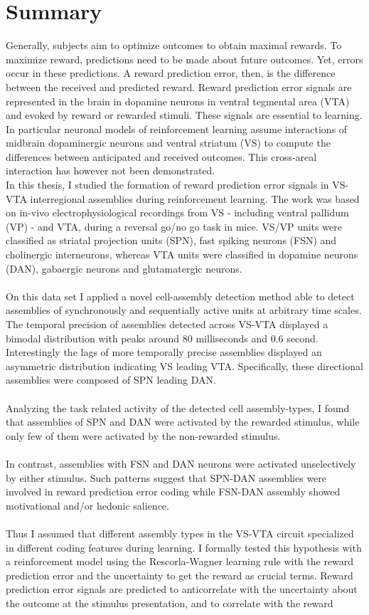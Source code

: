 \section*{Summary}
Generally, subjects aim to optimize outcomes to obtain maximal rewards. To maximize reward, predictions need to be made about future outcomes. Yet, errors occur in these predictions. A reward prediction error, then, is the difference between the received and predicted reward. Reward prediction error signals are represented in the brain in dopamine neurons in ventral tegmental area  (VTA) and evoked by reward or rewarded stimuli. These signals are essential to learning. In particular neuronal models of reinforcement learning assume interactions of midbrain dopaminergic neurons and ventral striatum (VS) to compute the differences between anticipated and received outcomes. This cross-areal interaction has however not been demonstrated.\\In this thesis, I studied the formation of reward prediction error signals in VS-VTA interregional assemblies during reinforcement learning. The work was based on in-vivo electrophysiological recordings from VS - including ventral pallidum (VP) - and VTA, during a reversal go/no go task in mice. VS/VP units were classified as striatal projection units (SPN), fast spiking neurons (FSN) and cholinergic interneurons, whereas VTA units were classified in dopamine neurons (DAN), gabaergic neurons and glutamatergic neurons.\\\\On this data set I applied a novel cell-assembly detection method able to detect assemblies of synchronously and sequentially active units at arbitrary time scales. The temporal precision of assemblies detected across VS-VTA displayed a bimodal distribution with peaks around $80$ milliseconds and $0.6$ second. Interestingly the lags of more temporally precise assemblies displayed an asymmetric distribution indicating VS leading VTA. Specifically, these directional assemblies were composed of SPN leading DAN.\\\\Analyzing the task related activity of the detected cell assembly-types, I found that assemblies of SPN and DAN were activated by the rewarded stimulus, while only few of them were activated by the non-rewarded stimulus.\\\\In contrast, assemblies with FSN and DAN neurons were activated unselectively by either stimulus. Such patterns suggest that SPN-DAN assemblies were involved in reward prediction error coding while FSN-DAN assembly showed motivational and/or hedonic salience.\\\\Thus I assumed that different assembly types in the VS-VTA circuit specialized in different coding features during learning. I formally tested this hypothesis with a reinforcement model using the Rescorla-Wagner learning rule with the reward prediction error and the uncertainty to get the reward as crucial terms. Reward prediction error signals are predicted to anticorrelate with the uncertainty about the outcome at the stimulus presentation, and to correlate with the reward 
